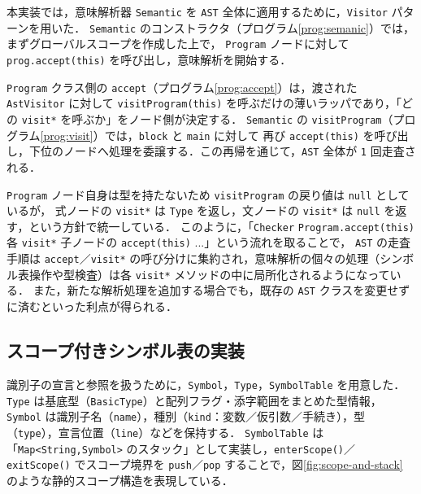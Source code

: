 \documentclass[a4j,10pt]{jarticle}
\begin{document}
本実装では，意味解析器 \verb|Semantic| を \verb|AST| 全体に適用するために，\verb|Visitor| パターンを用いた．
\verb|Semantic| のコンストラクタ（プログラム\ref{prog:semanic}）では，まずグローバルスコープを作成した上で，
\verb|Program| ノードに対して \verb|prog.accept(this)| を呼び出し，意味解析を開始する．



\verb|Program| クラス側の \verb|accept|（プログラム\ref{prog:accept}）は，渡された \verb|AstVisitor| に対して
\verb|visitProgram(this)| を呼ぶだけの薄いラッパであり，「どの \verb|visit*| を呼ぶか」をノード側が決定する．
\verb|Semantic| の \verb|visitProgram|（プログラム\ref{prog:visit}）では，\verb|block| と \verb|main| に対して
再び \verb|accept(this)| を呼び出し，下位のノードへ処理を委譲する．この再帰を通じて，\verb|AST| 全体が
\verb|1| 回走査される．





\verb|Program| ノード自身は型を持たないため \verb|visitProgram| の戻り値は \verb|null| としているが，
式ノードの \verb|visit*| は \verb|Type| を返し，文ノードの \verb|visit*| は \verb|null| を返す，という方針で統一している．
このように，「\verb|Checker| \textrightarrow{} \verb|Program.accept(this)| \textrightarrow{} 各 \verb|visit*| \textrightarrow{} 子ノードの \verb|accept(this)| \textrightarrow{} ...」という流れを取ることで，
\verb|AST| の走査手順は \verb|accept|／\verb|visit*| の呼び分けに集約され，意味解析の個々の処理（シンボル表操作や型検査）は各 \verb|visit*| メソッドの中に局所化されるようになっている．
また，新たな解析処理を追加する場合でも，既存の \verb|AST| クラスを変更せずに済むといった利点が得られる．

\subsection{スコープ付きシンボル表の実装}

識別子の宣言と参照を扱うために，\verb|Symbol|，\verb|Type|，\verb|SymbolTable| を用意した．
\verb|Type| は基底型（\verb|BasicType|）と配列フラグ・添字範囲をまとめた型情報，\verb|Symbol| は識別子名（\verb|name|），種別（\verb|kind|：変数／仮引数／手続き），型（\verb|type|），宣言位置（\verb|line|）などを保持する．
\verb|SymbolTable| は「\verb|Map<String,Symbol>| のスタック」として実装し，\verb|enterScope()|／\verb|exitScope()| でスコープ境界を \verb|push|／\verb|pop| することで，図\ref{fig:scope-and-stack} のような静的スコープ構造を表現している．
\end{document}
